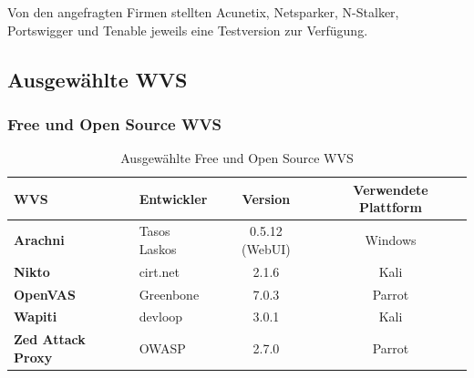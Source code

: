 \documentclass[12pt,oneside,a4paper,parskip]{scrbook}
\begin{document}
  Von den angefragten Firmen stellten Acunetix, Netsparker, N-Stalker, Portswigger und Tenable jeweils eine Testversion zur Verfügung.

  \subsection{Ausgewählte WVS}
    \subsubsection{Free und Open Source WVS}
      \begin{table}[H]
        \centering
          \begin{tabular}{|l|l|c|c|}
            \hline
            \textbf{WVS}              & \textbf{Entwickler}  & \textbf{Version}     & \textbf{Verwendete Plattform}  \\
            \hline
            \textbf{Arachni}          & Tasos Laskos         & 0.5.12 (WebUI)       & Windows                       \\
            \hline
            \textbf{Nikto}            & cirt.net             & 2.1.6                & Kali                          \\
            \hline
            \textbf{OpenVAS}          & Greenbone            & 7.0.3                & Parrot                        \\
            \hline
            \textbf{Wapiti}           & devloop              & 3.0.1                & Kali                          \\
            \hline
            \textbf{Zed Attack Proxy} & OWASP                & 2.7.0                & Parrot                        \\
            \hline
          \end{tabular}
        \caption[Ausgewählte Free und Open Source WVS]{Ausgewählte Free und Open Source WVS}
      \end{table}
\end{document}
